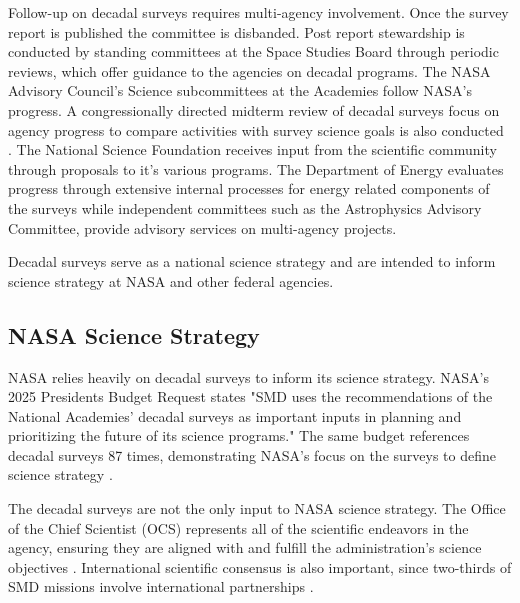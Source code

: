 \documentclass[preprint,12pt]{elsarticle}
\begin{document}
Follow-up on decadal surveys requires multi-agency involvement. Once the survey report is published the committee is disbanded. Post report stewardship is conducted by standing committees at the Space Studies Board through periodic reviews, which offer guidance to the agencies on decadal programs. The NASA Advisory Council's Science subcommittees at the Academies follow NASA's progress. A congressionally directed midterm review of decadal surveys focus on agency progress to compare activities with survey science goals is also conducted \cite{congress2005nasa}. The National Science Foundation receives input from the scientific community through proposals to it's various programs. The Department of Energy evaluates progress through extensive internal processes for energy related components of the surveys while independent committees such as the Astrophysics Advisory Committee, provide advisory services on multi-agency projects.

Decadal surveys serve as a national science strategy and are intended to inform science strategy at NASA and other federal agencies. 

\subsection{NASA Science Strategy}
NASA relies heavily on decadal surveys to inform its science strategy. NASA's 2025 Presidents Budget Request states "SMD uses the recommendations of the National Academies' decadal surveys as important inputs in planning and prioritizing the future of its science programs." The same budget references decadal surveys 87 times, demonstrating NASA's focus on the surveys to define science strategy \cite{NASA2025budget}. 

The decadal surveys are not the only input to NASA science strategy. The Office of the Chief Scientist (OCS) represents all of the scientific endeavors in the agency, ensuring they are aligned with and fulfill the administration's science objectives \cite{nasa_partnerships_2024}. International scientific consensus is also important, since two-thirds of SMD missions involve international partnerships \cite{nasa_smd_hearing_2024}. 
 
\end{document}
